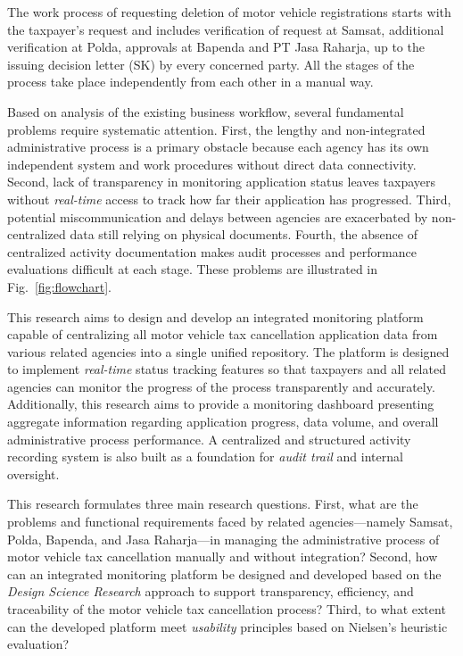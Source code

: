 \documentclass[conference,a4paper]{IEEEtran}
\begin{document}
The work process of requesting deletion of motor vehicle registrations starts with the taxpayer's request and includes verification of request at Samsat, additional verification at Polda, approvals at Bapenda and PT Jasa Raharja, up to the issuing decision letter (SK) by every concerned party. All the stages of the process take place independently from each other in a manual way.

Based on analysis of the existing business workflow, several fundamental problems require systematic attention. First, the lengthy and non-integrated administrative process is a primary obstacle because each agency has its own independent system and work procedures without direct data connectivity. Second, lack of transparency in monitoring application status leaves taxpayers without \emph{real-time} access to track how far their application has progressed. Third, potential miscommunication and delays between agencies are exacerbated by non-centralized data still relying on physical documents. Fourth, the absence of centralized activity documentation makes audit processes and performance evaluations difficult at each stage. These problems are illustrated in Fig.~\ref{fig:flowchart}.

This research aims to design and develop an integrated monitoring platform capable of centralizing all motor vehicle tax cancellation application data from various related agencies into a single unified repository. The platform is designed to implement \emph{real-time} status tracking features so that taxpayers and all related agencies can monitor the progress of the process transparently and accurately. Additionally, this research aims to provide a monitoring dashboard presenting aggregate information regarding application progress, data volume, and overall administrative process performance. A centralized and structured activity recording system is also built as a foundation for \emph{audit trail} and internal oversight.

This research formulates three main research questions. First, what are the problems and functional requirements faced by related agencies---namely Samsat, Polda, Bapenda, and Jasa Raharja---in managing the administrative process of motor vehicle tax cancellation manually and without integration? Second, how can an integrated monitoring platform be designed and developed based on the \emph{Design Science Research} approach to support transparency, efficiency, and traceability of the motor vehicle tax cancellation process? Third, to what extent can the developed platform meet \emph{usability} principles based on Nielsen's heuristic evaluation?
\end{document}

